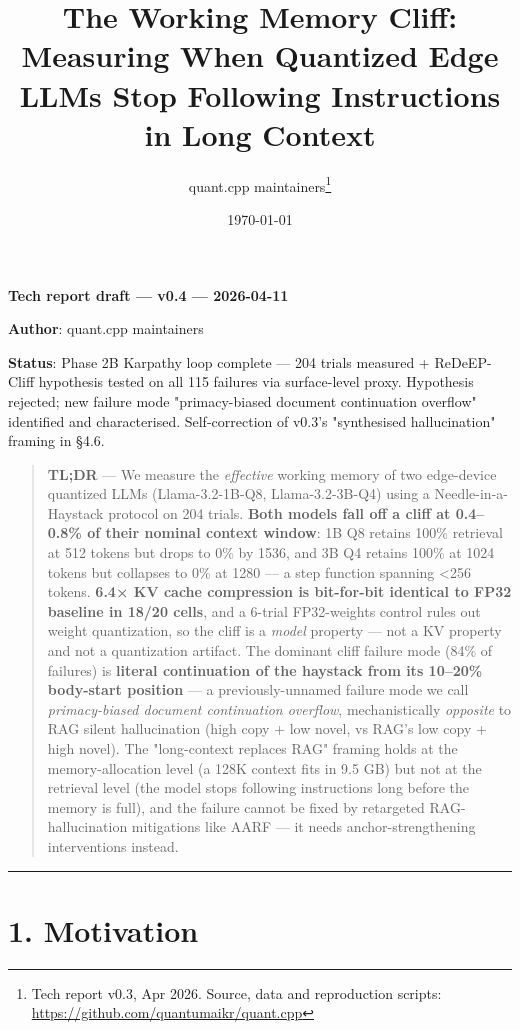 \documentclass[11pt]{article}
\title{The Working Memory Cliff: Measuring When Quantized Edge LLMs Stop Following Instructions in Long Context}
\author{quant.cpp maintainers\thanks{Tech report v0.3, Apr 2026. Source, data and reproduction scripts: \url{https://github.com/quantumaikr/quant.cpp}}}
\date{\today}
\begin{document}
\maketitle



\textbf{Tech report draft — v0.4 — 2026-04-11}

\textbf{Author}: quant.cpp maintainers

\textbf{Status}: Phase 2B Karpathy loop complete — 204 trials measured + ReDeEP-Cliff hypothesis tested on all 115 failures via surface-level proxy. Hypothesis rejected; new failure mode "primacy-biased document continuation overflow" identified and characterised. Self-correction of v0.3's "synthesised hallucination" framing in §4.6.


\begin{quote}
\textbf{TL;DR} — We measure the \textit{effective} working memory of two edge-device quantized LLMs (Llama-3.2-1B-Q8, Llama-3.2-3B-Q4) using a Needle-in-a-Haystack protocol on 204 trials. \textbf{Both models fall off a cliff at 0.4–0.8\% of their nominal context window}: 1B Q8 retains 100\% retrieval at 512 tokens but drops to 0\% by 1536, and 3B Q4 retains 100\% at 1024 tokens but collapses to 0\% at 1280 — a step function spanning <256 tokens. \textbf{6.4× KV cache compression is bit-for-bit identical to FP32 baseline in 18/20 cells}, and a 6-trial FP32-weights control rules out weight quantization, so the cliff is a \textit{model} property — not a KV property and not a quantization artifact. The dominant cliff failure mode (84\% of failures) is \textbf{literal continuation of the haystack from its 10–20\% body-start position} — a previously-unnamed failure mode we call \textit{primacy-biased document continuation overflow}, mechanistically \textit{opposite} to RAG silent hallucination (high copy + low novel, vs RAG's low copy + high novel). The "long-context replaces RAG" framing holds at the memory-allocation level (a 128K context fits in 9.5 GB) but not at the retrieval level (the model stops following instructions long before the memory is full), and the failure cannot be fixed by retargeted RAG-hallucination mitigations like AARF — it needs anchor-strengthening interventions instead.
\end{quote}


\medskip\hrule\medskip


\section*{1. Motivation}
\end{document}
